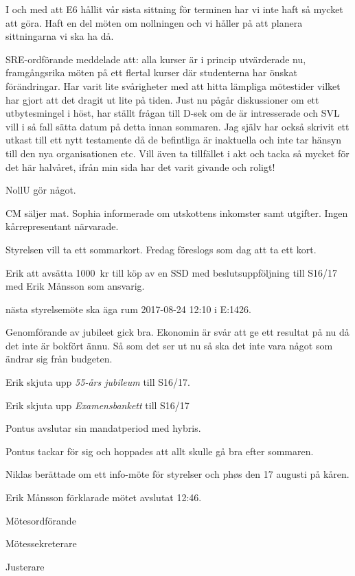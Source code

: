 \documentclass[10pt]{article}
\def\mo{Erik Månsson}
\def\ms{Johan Karlberg}
\def\ji{Linnea Sjödahl}
\begin{document}
\begin{paragrafer}
\begin{paragrafer}
I och med att E6 hållit vår sista sittning för terminen har vi inte haft så mycket att göra. Haft en del möten om nollningen och vi håller på att planera sittningarna vi ska ha då.

SRE-ordförande meddelade att: alla kurser är i princip utvärderade nu, framgångsrika möten på ett flertal kurser där studenterna har önskat förändringar. Har varit lite svårigheter med att hitta lämpliga mötestider vilket har gjort att det dragit ut lite på tiden. Just nu pågår diskussioner om ett utbytesmingel i höst, har ställt frågan till D-sek om de är intresserade och SVL vill i så fall sätta datum på detta innan sommaren. Jag själv har också skrivit ett utkast till ett nytt testamente då de befintliga är inaktuella och inte tar hänsyn till den nya organisationen etc. Vill även ta tillfället i akt och tacka så mycket för det här halvåret, ifrån min sida har det varit givande och roligt!

NollU gör något.

CM säljer mat.
Sophia informerade om utskottens inkomster samt utgifter.
Ingen kårrepresentant närvarade.
\end{paragrafer}

Styrelsen vill ta ett sommarkort. Fredag föreslogs som dag att ta ett kort.

Erik \ypa att avsätta \SI{1000}{kr} till köp av en SSD med beslutsuppföljning till S16/17 med Erik Månsson som ansvarig.

\Mbaby

{\Mba} nästa styrelsemöte ska äga rum 2017-08-24 12:10 i E:1426.

Genomförande av jubileet gick bra. Ekonomin är svår att ge ett resultat på nu då det inte är bokfört ännu. Så som det ser ut nu så ska det inte vara något som ändrar sig från budgeten.

Erik \ypa skjuta upp \emph{55-års jubileum} till S16/17.

\Mbaby

Erik \ypa skjuta upp \emph{Examensbankett} till S16/17

\Mbaby
{}
Pontus avslutar sin mandatperiod med hybris.

Pontus tackar för sig och hoppades att allt skulle gå bra efter sommaren.

Niklas berättade om ett info-möte för styrelser och phøs den 17 augusti på kåren.

{\mo} förklarade mötet avslutat 12:46.

\end{paragrafer}

\hidesignfoot
\begin{signatures}{3}
\signature{\mo}{Mötesordförande}
\signature{\ms}{Mötessekreterare}
\signature{\ji}{Justerare}
\end{signatures}
\end{document}
